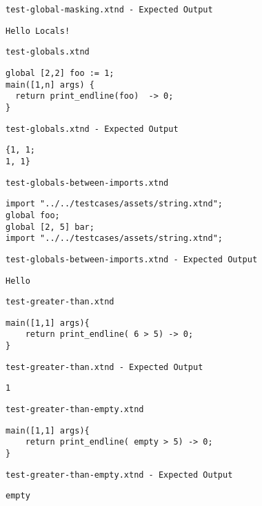 \medskip \noindent \texttt{test-global-masking.xtnd - Expected Output}


\begin{lstlisting}
Hello Locals!
\end{lstlisting}


\medskip \noindent \texttt{test-globals.xtnd}


\begin{lstlisting}
global [2,2] foo := 1;
main([1,n] args) {
  return print_endline(foo)  -> 0;
}
\end{lstlisting}


\medskip \noindent \texttt{test-globals.xtnd - Expected Output}


\begin{lstlisting}
{1, 1;
1, 1}
\end{lstlisting}


\medskip \noindent \texttt{test-globals-between-imports.xtnd}


\begin{lstlisting}
import "../../testcases/assets/string.xtnd";
global foo;
global [2, 5] bar;
import "../../testcases/assets/string.xtnd";
\end{lstlisting}


\medskip \noindent \texttt{test-globals-between-imports.xtnd - Expected Output}


\begin{lstlisting}
Hello
\end{lstlisting}


\medskip \noindent \texttt{test-greater-than.xtnd}


\begin{lstlisting}
main([1,1] args){
	return print_endline( 6 > 5) -> 0;
}
\end{lstlisting}


\medskip \noindent \texttt{test-greater-than.xtnd - Expected Output}


\begin{lstlisting}
1
\end{lstlisting}


\medskip \noindent \texttt{test-greater-than-empty.xtnd}


\begin{lstlisting}
main([1,1] args){
	return print_endline( empty > 5) -> 0;
}
\end{lstlisting}


\medskip \noindent \texttt{test-greater-than-empty.xtnd - Expected Output}


\begin{lstlisting}
empty
\end{lstlisting}


